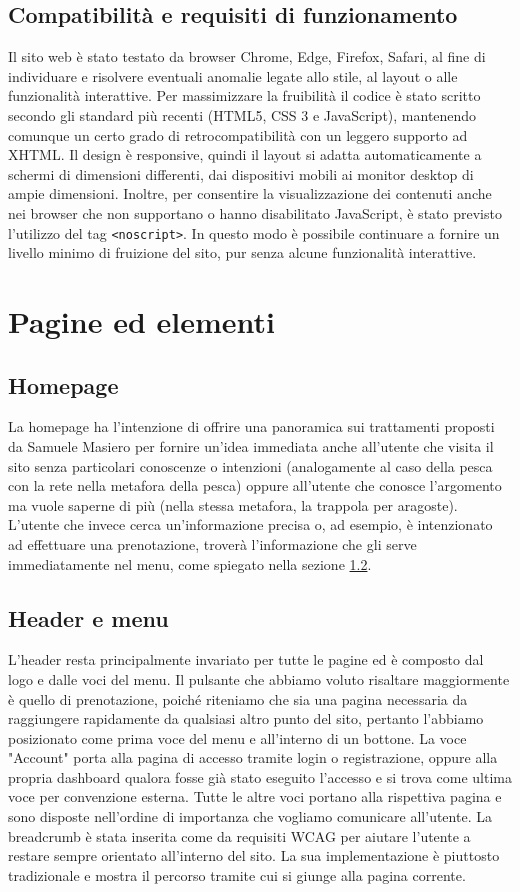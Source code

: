 \documentclass{article}
\begin{document}
\subsection{Compatibilità e requisiti di funzionamento}
Il sito web è stato testato da browser Chrome, Edge, Firefox, Safari, al fine di individuare e risolvere eventuali anomalie legate allo stile, al layout o alle funzionalità interattive. Per massimizzare la fruibilità il codice è stato scritto secondo gli standard più recenti (HTML5, CSS 3 e JavaScript), mantenendo comunque un certo grado di retrocompatibilità con un leggero supporto ad XHTML. Il design è responsive, quindi il layout si adatta automaticamente a schermi di dimensioni differenti, dai dispositivi mobili ai monitor desktop di ampie dimensioni. Inoltre, per consentire la visualizzazione dei contenuti anche nei browser che non supportano o hanno disabilitato JavaScript, è stato previsto l'utilizzo del tag \verb|<noscript>|. In questo modo è possibile continuare a fornire un livello minimo di fruizione del sito, pur senza alcune funzionalità interattive.
\section{Pagine ed elementi}
\subsection{Homepage}
La homepage ha l'intenzione di offrire una panoramica sui trattamenti proposti da Samuele Masiero per fornire un'idea immediata anche all'utente che visita il sito senza particolari conoscenze o intenzioni (analogamente al caso della pesca con la rete nella metafora della pesca) oppure all'utente che conosce l'argomento ma vuole saperne di più (nella stessa metafora, la trappola per aragoste). L'utente che invece cerca un'informazione precisa o, ad esempio, è intenzionato ad effettuare una prenotazione, troverà l'informazione che gli serve immediatamente nel menu, come spiegato nella sezione \ref{headermenu}.
\newpage
\subsection{Header e menu} \label{headermenu}
L'header resta principalmente invariato per tutte le pagine ed è composto dal logo e dalle voci del menu. Il pulsante che abbiamo voluto risaltare maggiormente è quello di prenotazione, poiché riteniamo che sia una pagina necessaria da raggiungere rapidamente da qualsiasi altro punto del sito, pertanto l'abbiamo posizionato come prima voce del menu e all'interno di un bottone. La voce "Account" porta alla pagina di accesso tramite login o registrazione, oppure alla propria dashboard qualora fosse già stato eseguito l'accesso e si trova come ultima voce per convenzione esterna. Tutte le altre voci portano alla rispettiva pagina e sono disposte nell'ordine di importanza che vogliamo comunicare all'utente. La breadcrumb è stata inserita come da requisiti WCAG per aiutare l'utente a restare sempre orientato all'interno del sito. La sua implementazione è piuttosto tradizionale e mostra il percorso tramite cui si giunge alla pagina corrente.
\end{document}

